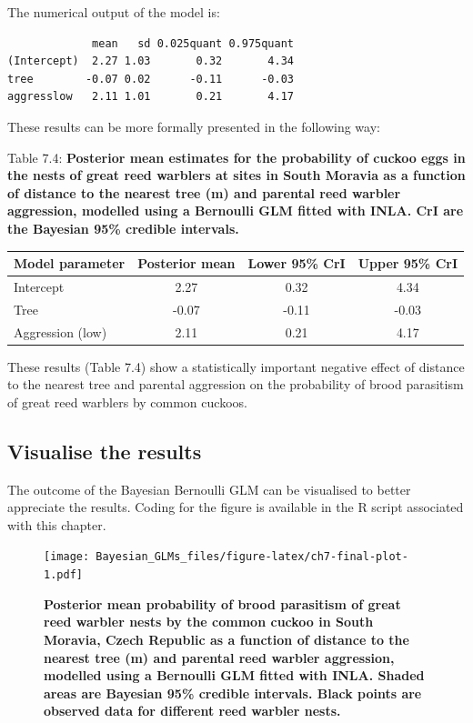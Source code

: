 \documentclass[
]{book}
\begin{document}
The numerical output of the model is:

\begin{verbatim}
             mean   sd 0.025quant 0.975quant
(Intercept)  2.27 1.03       0.32       4.34
tree        -0.07 0.02      -0.11      -0.03
aggresslow   2.11 1.01       0.21       4.17
\end{verbatim}

These results can be more formally presented in the following way:

Table 7.4: \textbf{Posterior mean estimates for the probability of cuckoo eggs in the nests of great reed warblers at sites in South Moravia as a function of distance to the nearest tree (m) and parental reed warbler aggression, modelled using a Bernoulli GLM fitted with INLA. CrI are the Bayesian 95\% credible intervals.}

\begin{longtable}[]{@{}lccc@{}}
\toprule
Model parameter & Posterior mean & Lower 95\% CrI & Upper 95\% CrI \\
\midrule
\endhead
Intercept & 2.27 & 0.32 & 4.34 \\
Tree & -0.07 & -0.11 & -0.03 \\
Aggression (low) & 2.11 & 0.21 & 4.17 \\
\bottomrule
\end{longtable}

These results (Table 7.4) show a statistically important negative effect of distance to the nearest tree and parental aggression on the probability of brood parasitism of great reed warblers by common cuckoos.

\hypertarget{visualise-the-results-3}{%
\subsection{Visualise the results}\label{visualise-the-results-3}}

The outcome of the Bayesian Bernoulli GLM can be visualised to better appreciate the results. Coding for the figure is available in the R script associated with this chapter.



\begin{figure}
\centering
\texttt{[image: Bayesian\_GLMs\_files/figure-latex/ch7-final-plot-1.pdf]}
\caption{\label{fig:ch7-final-plot}\textbf{Posterior mean probability of brood parasitism of great reed warbler nests by the common cuckoo in South Moravia, Czech Republic as a function of distance to the nearest tree (m) and parental reed warbler aggression, modelled using a Bernoulli GLM fitted with INLA. Shaded areas are Bayesian 95\% credible intervals. Black points are observed data for different reed warbler nests.}}
\end{figure}
\end{document}
